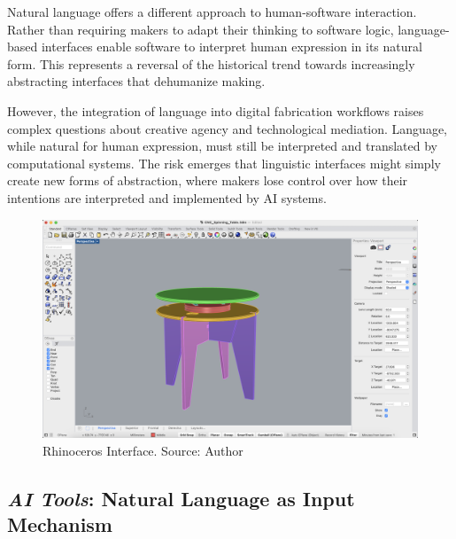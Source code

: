 \vspace{0.5cm}

Natural language offers a different approach to human-software interaction. Rather than requiring makers to adapt their thinking to software logic, language-based interfaces enable software to interpret human expression in its natural form. This represents a reversal of the historical trend towards increasingly abstracting interfaces that dehumanize making.

\vspace{0.5cm}

However, the integration of language into digital fabrication workflows raises complex questions about creative agency and technological mediation. Language, while natural for human expression, must still be interpreted and translated by computational systems. The risk emerges that linguistic interfaces might simply create new forms of abstraction, where makers lose control over how their intentions are interpreted and implemented by AI systems.

\begin{figure}[H]
\centering
\includegraphics[width=1\textwidth]{figures/chapter3/RHINO_1.png}
\caption{Rhinoceros Interface. Source: Author}
\label{fig:rhino_interface}
\end{figure}

\subsection{\textit{AI Tools}: Natural Language as Input Mechanism}

